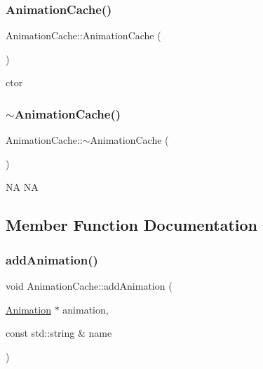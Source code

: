 \subsubsection{\texorpdfstring{Animation\+Cache()}{AnimationCache()}\hspace{0.1cm}{\footnotesize\ttfamily [2/2]}}
{\footnotesize\ttfamily Animation\+Cache\+::\+Animation\+Cache (\begin{DoxyParamCaption}{ }\end{DoxyParamCaption})}

ctor \mbox{\label{classAnimationCache_adfc3cbd2a736624fea3cb878494fd5a6}} 
\subsubsection{\texorpdfstring{$\sim$\+Animation\+Cache()}{~AnimationCache()}\hspace{0.1cm}{\footnotesize\ttfamily [2/2]}}
{\footnotesize\ttfamily Animation\+Cache\+::$\sim$\+Animation\+Cache (\begin{DoxyParamCaption}{ }\end{DoxyParamCaption})}

NA  NA 

\subsection{Member Function Documentation}
\mbox{\label{classAnimationCache_a520a7c0199b75c670195210fa79703d9}} 
\subsubsection{\texorpdfstring{add\+Animation()}{addAnimation()}\hspace{0.1cm}{\footnotesize\ttfamily [1/2]}}
{\footnotesize\ttfamily void Animation\+Cache\+::add\+Animation (\begin{DoxyParamCaption}\item[{\hyperlink{classAnimation}{Animation} $\ast$}]{animation,  }\item[{const std\+::string \&}]{name }\end{DoxyParamCaption})}

